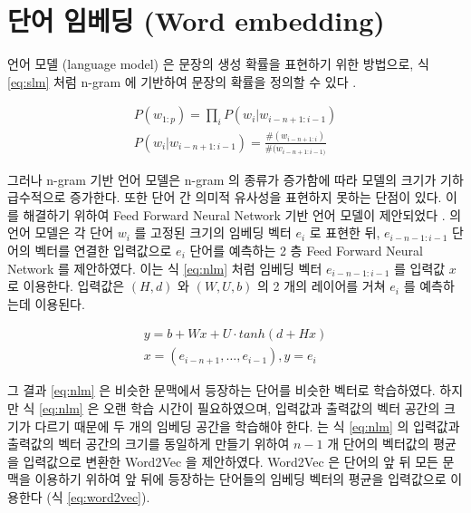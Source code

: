 \documentclass[oneside, ko,phd]{snuthesis_utf8_kor}
\begin{document}
\section{단어 임베딩 (Word embedding)}

언어 모델 (language model) 은 문장의 생성 확률을 표현하기 위한 방법으로, 식 \ref{eq:slm} 처럼 n-gram 에 기반하여 문장의 확률을 정의할 수 있다 \cite{jurafsky2014speech}.

\begin{equation}
  \label{eq:slm}
  \begin{aligned}
  P(w_{1:p}) = \prod_i P(w_i \vert w_{i-n+1:i-1}) \\
  P(w_i \vert w_{i-n+1:i-1}) = \frac{\#(w_{i-n+1:i})}{\#(w_{i-n+1:i-1)}}
  \end{aligned}
\end{equation}

그러나 n-gram 기반 언어 모델은 n-gram 의 종류가 증가함에 따라 모델의 크기가 기하급수적으로 증가한다.
또한 단어 간 의미적 유사성을 표현하지 못하는 단점이 있다.
이를 해결하기 위하여 Feed Forward Neural Network 기반 언어 모델이 제안되었다 \cite{bengio2003neural}.
\cite{bengio2003neural} 의 언어 모델은 각 단어 $w_i$ 를 고정된 크기의 임베딩 벡터 $e_i$ 로 표현한 뒤, $e_{i-n-1:i-1}$ 단어의 벡터를 연결한 입력값으로 $e_i$ 단어를 예측하는 2 층 Feed Forward Neural Network 를 제안하였다.
이는 식 \ref{eq:nlm} 처럼 임베딩 벡터 $e_{i-n-1:i-1}$ 를 입력값 $x$ 로 이용한다.
입력값은 $(H, d)$ 와 $(W, U, b)$ 의 2 개의 레이어를 거쳐 $e_i$ 를 예측하는데 이용된다.

\begin{equation}
  \label{eq:nlm}
  \begin{aligned}
  y = b + Wx + U \cdot tanh(d + Hx) \\
  x = (e_{i-n+1}, \dots, e_{i-1}), y = e_i
  \end{aligned}
\end{equation}

그 결과 \ref{eq:nlm} 은 비슷한 문맥에서 등장하는 단어를 비슷한 벡터로 학습하였다.
하지만 식 \ref{eq:nlm} 은 오랜 학습 시간이 필요하였으며, 입력값과 출력값의 벡터 공간의 크기가 다르기 때문에 두 개의 임베딩 공간을 학습해야 한다.
\cite{mikolov2013efficient} 는 식 \ref{eq:nlm} 의 입력값과 출력값의 벡터 공간의 크기를 동일하게 만들기 위하여 $n-1$ 개 단어의 벡터값의 평균을 입력값으로 변환한 Word2Vec 을 제안하였다.
Word2Vec 은 단어의 앞 뒤 모든 문맥을 이용하기 위하여 앞 뒤에 등장하는 단어들의 임베딩 벡터의 평균을 입력값으로 이용한다 (식 \ref{eq:word2vec}).
\end{document}
